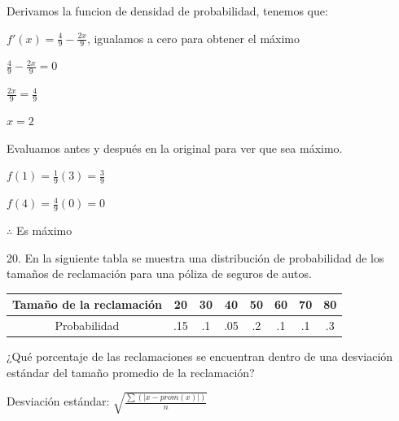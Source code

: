 \documentclass{article}
\begin{document}
        Derivamos la funcion de densidad de probabilidad, tenemos que:\vspace{.1cm}

        $f'(x) = \frac{4}{9} - \frac{2x}{9}$, igualamos a cero para obtener el máximo\vspace{.1cm}

        $\frac{4}{9} - \frac{2x}{9} = 0$\vspace{.1cm}

        $\frac{2x}{9} = \frac{4}{9}$\vspace{.1cm}

        $x = 2$\vspace{.1cm}

        Evaluamos antes y después en la original para ver que sea máximo. \vspace{.1cm}

        $f(1) = \frac{1}{9}(3) = \frac{3}{9}$\vspace{.1cm}

        $f(4) = \frac{4}{9}(0) = 0$\vspace{.1cm}

        $\therefore$ Es máximo

        20. En la siguiente tabla se muestra una distribución de 
        probabilidad de los tamaños de reclamación para una 
        póliza de seguros de autos. \vspace{.1cm}
        
        \begin{center}
            \begin{tabular}{| c | c | c | c | c | c | c | c |}
                \hline
                Tamaño de la reclamación & 20 & 30 & 40 & 50 & 60 & 70 & 80\\ \hline
                Probabilidad & .15 & .1 & .05 & .2 & .1 & .1 & .3\\ \hline
            \end{tabular} \vspace{.1cm}    
        \end{center}

        ¿Qué porcentaje de las reclamaciones se encuentran dentro 
        de una desviación estándar del tamaño promedio de la 
        reclamación?\vspace{.1cm}

        \vspace{.1cm}

        Desviación estándar: $\sqrt{\frac{\displaystyle\sum(|x-prom(x)|)}{n}}$\vspace{.1cm}
\end{document}
